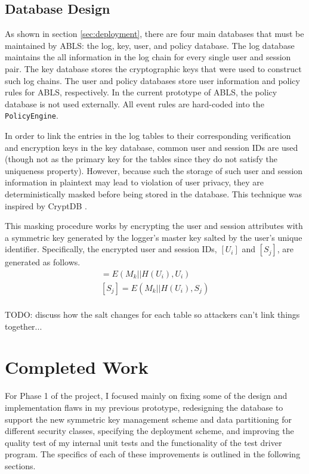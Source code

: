 \documentclass{sig-alternate}
\begin{document}
\subsection{Database Design}
\label{sec:databaseDesign}
As shown in section \ref{sec:deployment}, there are four main databases that must be maintained by ABLS:
the log, key, user, and policy database. The log database maintains the all information in the log chain for every 
single user and session pair. The key database stores the cryptographic keys that were used to construct
such log chains. The user and policy databases store user information and policy rules for ABLS, respectively. 
In the current prototype of ABLS, the policy database is not used externally. All event rules are hard-coded into
the {\tt PolicyEngine}. 

In order to link the entries in the log tables to their corresponding verification and encryption keys in the key database,
common user and session IDs are used (though not as the primary key for the tables since they do not satisfy
the uniqueness property). However, because such the storage of such user and session information in plaintext
may lead to violation of user privacy, they are deterministically masked before being stored in the database. This technique
was inspired by CryptDB \cite{Popa2012-CryptDB}.

This masking procedure works by encrypting the user and session attributes with a symmetric key generated
by the logger's master key salted by the user's unique identifier. Specifically, the encrypted user and session IDs, 
$[U_i]$ and $[S_j]$, are generated as follows.
\begin{align*}
[U_i] = E(M_k || H(U_i), U_i) \\
[S_j] = E(M_k || H(U_i), S_j) \\
\end{align*}

TODO: discuss how the salt changes for each table so attackers can't link things together...


\section{Completed Work}
For Phase 1 of the project, I focused mainly on fixing some of the design and implementation flaws in my previous 
prototype, redesigning the database to support the new symmetric key management scheme and data 
partitioning for different security classes, specifying the deployment scheme, and improving the quality test
of my internal unit tests and the functionality of the test driver program. The specifics of each of these improvements is
outlined in the following sections.
\end{document}
